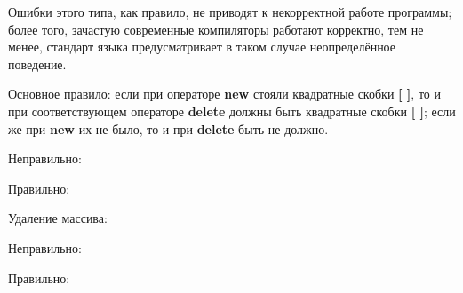 \begin{typerror}
	\label{TE_delete-brackets}

	Ошибки этого типа, как правило, не приводят к некорректной работе программы;
	более того, зачастую современные компиляторы работают корректно, тем не менее, стандарт языка предусматривает в таком случае неопределённое поведение.

	Основное правило:
	если при операторе \textbf{new} стояли квадратные скобки \textbf{[ ]}, то и при соответствующем операторе \textbf{delete} должны быть квадратные скобки \textbf{[ ]};
	если же при \textbf{new} их не было, то и при \textbf{delete} быть не должно.

	Неправильно:

	Правильно:

	Удаление массива:

	Неправильно:

	Правильно:
	
\end{typerror}
